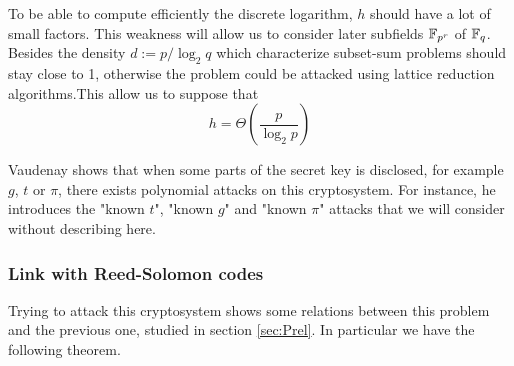 \documentclass[a4paper]{article}
\begin{document}
To be able to compute efficiently the discrete logarithm, $h$ should have a lot of small factors. This weakness will allow us to consider later subfields $\mathbb{F}_{p^r}$ of $\mathbb{F}_q$. Besides the density $d := p / \log_2 q$ which characterize subset-sum problems should stay close to 1, otherwise the problem could be attacked using lattice reduction algorithms.This allow us to suppose that
$$ h = \Theta\left( \frac{p}{\log_2 p} \right) $$

Vaudenay shows that when some parts of the secret key is disclosed, for example $g$, $t$ or $\pi$, there exists polynomial attacks on this cryptosystem. For instance, he introduces \cite{Vau01} the "known $t$", "known $g$" and "known $\pi$" attacks that we will consider without describing here.


\subsubsection{Link with Reed-Solomon codes}

Trying to attack this cryptosystem shows some relations between this problem and the previous one, studied in section \ref{sec:Prel}. In particular we have the following theorem.
\end{document}
